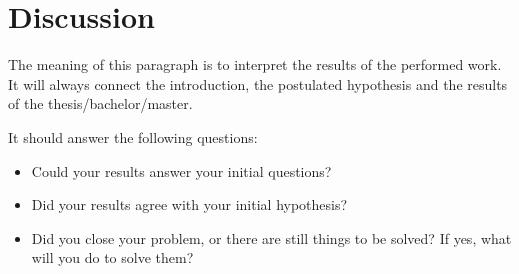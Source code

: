 \chapter{Discussion}

The meaning of this paragraph is to interpret the results of the performed work. It will always connect the introduction, the postulated hypothesis and the results of the thesis/bachelor/master.

It should answer the following questions:
\begin{itemize}
	\item Could your results answer your initial questions?
	\item Did your results agree with your initial hypothesis?
	\item Did you close your problem, or there are still things to be solved? If yes, what will you do to solve them? 
\end{itemize}
